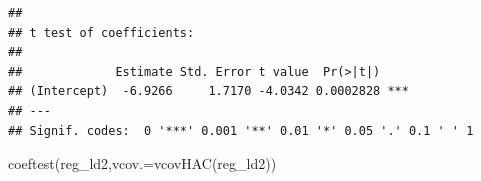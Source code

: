 \documentclass[
  12pt,
  oneside]{book}
\newenvironment{Shaded}{\begin{snugshade}}{\end{snugshade}}
\newcommand{\AttributeTok}[1]{\textcolor[rgb]{0.77,0.63,0.00}{#1}}
\newcommand{\DecValTok}[1]{\textcolor[rgb]{0.00,0.00,0.81}{#1}}
\newcommand{\FunctionTok}[1]{\textcolor[rgb]{0.00,0.00,0.00}{#1}}
\newcommand{\NormalTok}[1]{#1}
\newcommand{\OtherTok}[1]{\textcolor[rgb]{0.56,0.35,0.01}{#1}}
\newcommand{\SpecialCharTok}[1]{\textcolor[rgb]{0.00,0.00,0.00}{#1}}
\begin{document}
\begin{Shaded}
\end{Shaded}

\begin{verbatim}
## 
## t test of coefficients:
## 
##             Estimate Std. Error t value  Pr(>|t|)    
## (Intercept)  -6.9266     1.7170 -4.0342 0.0002828 ***
## ---
## Signif. codes:  0 '***' 0.001 '**' 0.01 '*' 0.05 '.' 0.1 ' ' 1
\end{verbatim}

\begin{Shaded}
\begin{Highlighting}[]
\FunctionTok{coeftest}\NormalTok{(reg\_ld2,}\AttributeTok{vcov.=}\FunctionTok{vcovHAC}\NormalTok{(reg\_ld2))}
\end{Highlighting}
\end{Shaded}
\end{document}
